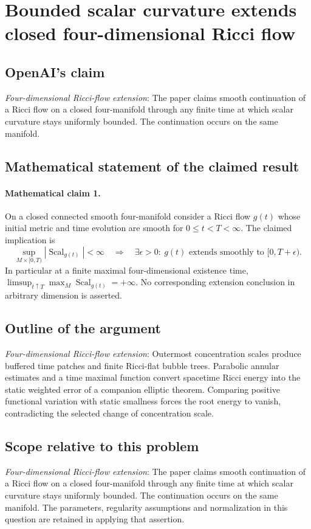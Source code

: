 \documentclass[11pt]{article}
\begin{document}
\section*{Bounded scalar curvature extends closed four-dimensional Ricci flow}

\subsection{OpenAI's claim}
\textit{Four-dimensional Ricci-flow extension}: The paper claims smooth continuation of a Ricci flow on a closed four-manifold through any finite time at which scalar curvature stays uniformly bounded. The continuation occurs on the same manifold.

\subsection{Mathematical statement of the claimed result}
\paragraph{Mathematical claim 1.} On a closed connected smooth four-manifold consider a Ricci flow $g(t)$ whose initial metric and time evolution are smooth for $0\le t<T<\infty$. The claimed implication is \[\sup_{M\times[0,T)}|\operatorname{Scal}_{g(t)}|<\infty\quad\Longrightarrow\quad\exists\epsilon>0:\ g(t)\text{ extends smoothly to }[0,T+\epsilon).\] In particular at a finite maximal four-dimensional existence time, $\limsup_{t\uparrow T}\max_M\operatorname{Scal}_{g(t)}=+\infty$. No corresponding extension conclusion in arbitrary dimension is asserted.

\subsection{Outline of the argument}
\textit{Four-dimensional Ricci-flow extension}: Outermost concentration scales produce buffered time patches and finite Ricci-flat bubble trees. Parabolic annular estimates and a time maximal function convert spacetime Ricci energy into the static weighted error of a companion elliptic theorem. Comparing positive functional variation with static smallness forces the root energy to vanish, contradicting the selected change of concentration scale.

\subsection{Scope relative to this problem}
\textit{Four-dimensional Ricci-flow extension}: The paper claims smooth continuation of a Ricci flow on a closed four-manifold through any finite time at which scalar curvature stays uniformly bounded. The continuation occurs on the same manifold. The parameters, regularity assumptions and normalization in this question are retained in applying that assertion.
\end{document}
